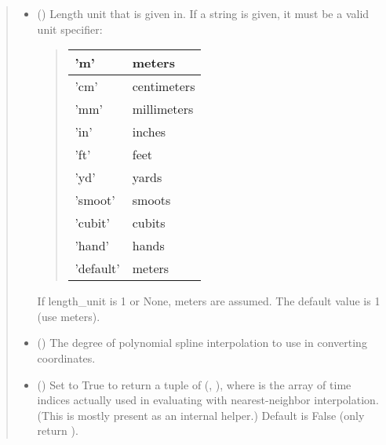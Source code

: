 \documentclass[letterpaper,10pt,english]{sphinxmanual}
\begin{document}
\begin{fulllineitems}
\begin{fulllineitems}
\begin{quote}
\begin{description}
\begin{itemize}
\item {} 
 () \textendash{} 
Length unit that  is given in.
If a string is given, it must be a valid unit specifier:
\begin{quote}


\begin{savenotes}\sphinxattablestart
\centering
\begin{tabulary}{\linewidth}[t]{|T|T|}
\hline

’m’
&
meters
\\
\hline
’cm’
&
centimeters
\\
\hline
’mm’
&
millimeters
\\
\hline
’in’
&
inches
\\
\hline
’ft’
&
feet
\\
\hline
’yd’
&
yards
\\
\hline
’smoot’
&
smoots
\\
\hline
’cubit’
&
cubits
\\
\hline
’hand’
&
hands
\\
\hline
’default’
&
meters
\\
\hline
\end{tabulary}
\par
\sphinxattableend\end{savenotes}
\end{quote}

If length\_unit is 1 or None, meters are assumed. The default
value is 1 (use meters).


\item {} 
 () \textendash{} The degree of polynomial spline interpolation to
use in converting coordinates.

\item {} 
 () \textendash{} Set to True to return a tuple of (,
), where  is the array of time indices
actually used in evaluating  with nearest-neighbor
interpolation. (This is mostly present as an internal helper.)
Default is False (only return ).

\end{itemize}


\end{description}
\end{quote}
\end{fulllineitems}
\end{fulllineitems}
\end{document}

